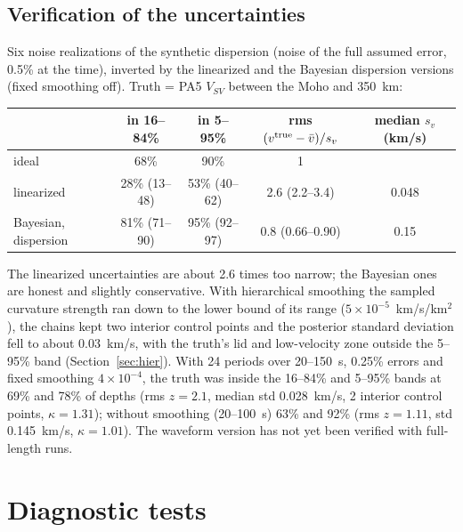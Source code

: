 \documentclass[11pt]{article}
\newcommand{\vsv}{V_{SV}}
\begin{document}
\subsection{Verification of the uncertainties}
Six noise realizations of the synthetic dispersion (noise of the full
assumed error, 0.5\% at the time), inverted by the linearized and the
Bayesian dispersion versions (fixed smoothing off). Truth = PA5 $\vsv$
between the Moho and 350~km:

\begin{center}\small
\begin{tabular}{lcccc}
\toprule
 & in 16--84\% & in 5--95\% & rms $(v^{\rm true}-\bar v)/s_v$ & median $s_v$ (km/s)\\
\midrule
ideal & 68\% & 90\% & 1 & \\
linearized & 28\% (13--48) & 53\% (40--62) & 2.6 (2.2--3.4) & 0.048\\
Bayesian, dispersion & 81\% (71--90) & 95\% (92--97) & 0.8 (0.66--0.90) & 0.15\\
\bottomrule
\end{tabular}
\end{center}
The linearized uncertainties are about 2.6 times too narrow; the Bayesian
ones are honest and slightly conservative. With hierarchical smoothing the
sampled curvature strength ran down to the lower bound of its range
($5\times10^{-5}$~km/s/km$^2$), the chains kept two interior control points
and the posterior standard deviation fell to about 0.03~km/s, with the
truth's lid and low-velocity zone outside the 5--95\% band
(Section~\ref{sec:hier}). With 24 periods over 20--150~s, 0.25\% errors and fixed smoothing
$4\times10^{-4}$, the truth was inside the 16--84\% and 5--95\% bands at 69\%
and 78\% of depths (rms $z=2.1$, median std 0.028~km/s, 2 interior control
points, $\kappa=1.31$); without smoothing (20--100~s) 63\% and 92\% (rms
$z=1.11$, std 0.145~km/s, $\kappa=1.01$). The waveform version has not yet
been verified with full-length runs.

\section{Diagnostic tests}\label{sec:tests}
\end{document}
